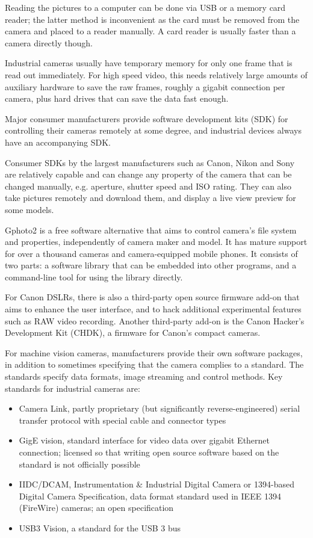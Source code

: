 Reading the pictures to a computer can be done via USB or a memory card reader; the latter method is inconvenient as the card must be removed from the camera and placed to a reader manually.
A card reader is usually faster than a camera directly though.

Industrial cameras usually have temporary memory for only one frame that is read out immediately.
For high speed video, this needs relatively large amounts of auxiliary hardware to save the raw frames, roughly a gigabit connection per camera, plus hard drives that can save the data fast enough.

Major consumer manufacturers provide software development kits (SDK) for controlling their cameras remotely at some degree, and industrial devices always have an accompanying SDK.

Consumer SDKs by the largest manufacturers such as Canon, Nikon and Sony are relatively capable and can change any property of the camera that can be changed manually, e.g. aperture, shutter speed and ISO rating.
They can also take pictures remotely and download them, and display a live view preview for some models.

Gphoto2 is a free software alternative that aims to control camera's file system and properties, independently of camera maker and model.
It has mature support for over a thousand cameras and camera-equipped mobile phones.
It consists of two parts: a software library that can be embedded into other programs, and a command-line tool for using the library directly.

For Canon DSLRs, there is also a third-party open source firmware add-on that aims to enhance the user interface, and to hack additional experimental features such as RAW video recording.
Another third-party add-on is the Canon Hacker's Development Kit (CHDK), a firmware for Canon's compact cameras.

For machine vision cameras, manufacturers provide their own software packages, in addition to sometimes specifying that the camera complies to a standard.
The standards specify data formats, image streaming and control methods.
Key standards for industrial cameras are:

\begin{itemize}
	\item Camera Link, partly proprietary (but significantly reverse-engineered) serial transfer protocol with special cable and connector types
	\item GigE vision, standard interface for video data over gigabit Ethernet connection; licensed so that writing open source software based on the standard is not officially possible
	\item IIDC/DCAM, Instrumentation \& Industrial Digital Camera or 1394-based Digital Camera Specification, data format standard used in IEEE 1394 (FireWire) cameras; an open specification
	\item USB3 Vision, a standard for the USB 3 bus
\end{itemize}

